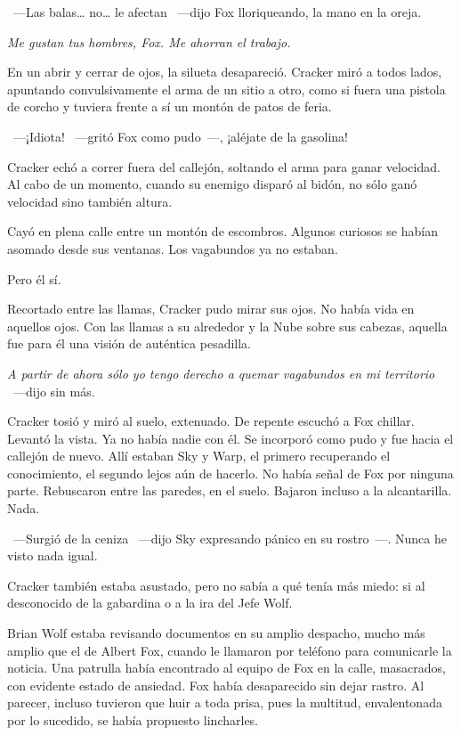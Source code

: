 ~---Las balas\dots{} no\dots{} le afectan ~---dijo Fox lloriqueando, la mano en la oreja.

\emph{Me gustan tus hombres, Fox. Me ahorran el trabajo.}

En un abrir y cerrar de ojos, la silueta desapareció. Cracker miró a todos lados, apuntando convulsivamente el arma de un sitio a otro, como si fuera una pistola de corcho y tuviera frente a sí un montón de patos de feria.

~---¡Idiota! ~---gritó Fox como pudo~---, ¡aléjate de la gasolina!

Cracker echó a correr fuera del callejón, soltando el arma para ganar velocidad. Al cabo de un momento, cuando su enemigo disparó al bidón, no sólo ganó velocidad sino también altura.

Cayó en plena calle entre un montón de escombros. Algunos curiosos se habían asomado desde sus ventanas. Los vagabundos ya no estaban.

Pero él sí.

Recortado entre las llamas, Cracker pudo mirar sus ojos. No había vida en aquellos ojos. Con las llamas a su alrededor y la Nube sobre sus cabezas, aquella fue para él una visión de auténtica pesadilla.

\emph{A partir de ahora sólo yo tengo derecho a quemar vagabundos en mi territorio} ~---dijo sin más.

Cracker tosió y miró al suelo, extenuado. De repente escuchó a Fox chillar. Levantó la vista. Ya no había nadie con él. Se incorporó como pudo y fue hacia el callejón de nuevo. Allí estaban Sky y Warp, el primero recuperando el conocimiento, el segundo lejos aún de hacerlo. No había señal de Fox por ninguna parte. Rebuscaron entre las paredes, en el suelo. Bajaron incluso a la alcantarilla. Nada.

~---Surgió de la ceniza ~---dijo Sky expresando pánico en su rostro~---. Nunca he visto nada igual.

Cracker también estaba asustado, pero no sabía a qué tenía más miedo: si al desconocido de la gabardina o a la ira del Jefe Wolf.

Brian Wolf estaba revisando documentos en su amplio despacho, mucho más amplio que el de Albert Fox, cuando le llamaron por teléfono para comunicarle la noticia. Una patrulla había encontrado al equipo de Fox en la calle, masacrados, con evidente estado de ansiedad. Fox había desaparecido sin dejar rastro. Al parecer, incluso tuvieron que huir a toda prisa, pues la multitud, envalentonada por lo sucedido, se había propuesto lincharles.

